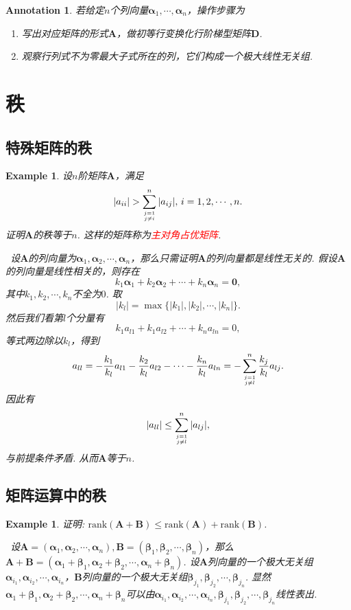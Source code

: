 \documentclass{article}
\newtheorem{example}[theorem]{Example}
\newtheorem{annotation}[theorem]{Annotation}
\newcommand{\hints}{{\color{blue} \text{hints}}}
\newcommand{\mbf}[1]{\bm{#1}}
\newcommand{\rank}[1]{\text{rank}\left(#1\right)} %
\newcommand{\redt}[1]{\textcolor{red}{#1}}
\begin{document}
\begin{annotation}
\rm 若给定$n$个列向量$\mbf{\alpha}_1,\cdots,\mbf{\alpha}_n$，操作步骤为
\begin{enumerate}
	\item 写出对应矩阵的形式$\mbf{A}$，做初等行变换化行阶梯型矩阵$\mbf{D}$.
	\item 观察行列式不为零最大子式所在的列，它们构成一个极大线性无关组. 
\end{enumerate}
\end{annotation}


\newpage
\section{秩}

\subsection{特殊矩阵的秩}

\begin{example}
\rm 设$n$阶矩阵$\mbf{A}$，满足
$$
|a_{ii}| >  \sum\limits_{j = 1 \atop j \neq i}^{n} |a_{ij}|, \, i = 1,2,\cdots,n.
$$
证明$\mbf{A}$的秩等于$n$. 这样的矩阵称为\redt{主对角占优矩阵}. 

\hints\  设$\mbf{A}$的列向量为$\mbf{\alpha}_1,\mbf{\alpha}_2,\cdots,\mbf{\alpha}_n$，那么只需证明$\mbf{A}$的列向量都是线性无关的. 假设$\mbf{A}$的列向量是线性相关的，则存在
$$
k_1\mbf{\alpha}_1 + k_2\mbf{\alpha}_2 + \cdots + k_n\mbf{\alpha}_n = \mbf{0},
$$
其中$k_1,k_2,\cdots,k_n$不全为$0$. 取
$$
|k_l| = \max\{|k_1|,|k_2|,\cdots,|k_n|\}. 
$$
然后我们看第$l$个分量有
$$
k_1a_{l1} + k_1a_{l2} + \cdots + k_na_{ln} = 0,
$$
等式两边除以$k_l$，得到
$$
a_{ll} = - \frac{k_1}{k_l}a_{l1} - \frac{k_2}{k_l}a_{l2} - \cdots -  \frac{k_n}{k_l}a_{ln} =  -\sum\limits_{j = 1 \atop j \neq l}^{n} \frac{k_j}{k_l} a_{lj}.
$$
因此有
$$
|a_{ll}| \leq \sum\limits_{j = 1 \atop j \neq l}^{n} |a_{lj}|,
$$
与前提条件矛盾. 从而$\mbf{A}$等于$n$. 
\end{example}

\subsection{矩阵运算中的秩}

\begin{example}
\rm 证明: $\rank{\mbf{A}+\mbf{B}} \leq \rank{\mbf{A}} + \rank{\mbf{B}}$.

\hints\ 设$\mbf{A} = (\mbf{\alpha}_1,\mbf{\alpha}_2,\cdots,\mbf{\alpha}_n),\mbf{B}=(\mbf{\beta}_1,\mbf{\beta}_2,\cdots,\mbf{\beta}_n)$，那么$\mbf{A}+\mbf{B} = (\mbf{\alpha}_1+\mbf{\beta}_1,\mbf{\alpha}_2+\mbf{\beta}_2,\cdots,\mbf{\alpha}_n+\mbf{\beta}_n)$. 设$\mbf{A}$列向量的一个极大无关组$\mbf{\alpha}_{i_1},\mbf{\alpha}_{i_2},\cdots,\mbf{\alpha}_{i_n}$，$\mbf{B}$列向量的一个极大无关组$\mbf{\beta}_{j_1},\mbf{\beta}_{j_2},\cdots,\mbf{\beta}_{j_n}$. 显然$\mbf{\alpha}_1+\mbf{\beta}_1,\mbf{\alpha}_2+\mbf{\beta}_2,\cdots,\mbf{\alpha}_n+\mbf{\beta}_n$可以由$\mbf{\alpha}_{i_1},\mbf{\alpha}_{i_2},\cdots,\mbf{\alpha}_{i_n},\mbf{\beta}_{j_1},\mbf{\beta}_{j_2},\cdots,\mbf{\beta}_{j_n}$线性表出. 
\end{example}
\end{document}
